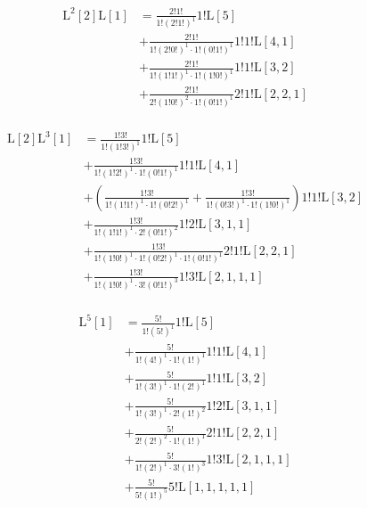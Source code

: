 \begin{equation*} \begin{aligned}
  \mathrm{L}^2[2] \mathrm{L}[1] &=
  \frac{2!1!}{1!(2!1!)^1}
  1! \mathrm{L}[5] \\ &
+ \frac{2!1!}{1!(2!0!)^1 \cdot 1!(0!1!)^1}
  1!1! \mathrm{L}[4, 1] \\ &
+ \frac{2!1!}{1!(1!1!)^1 \cdot 1!(1!0!)^1}
  1!1! \mathrm{L}[3, 2] \\ &
+ \frac{2!1!}{2!(1!0!)^2 \cdot 1!(0!1!)^1}
  2!1! \mathrm{L}[2, 2, 1] \\
\end{aligned} \end{equation*}

\begin{equation*} \begin{aligned}
  \mathrm{L}[2] \mathrm{L}^3[1] &=
  \frac{1!3!}{1!(1!3!)^1}
  1! \mathrm{L}[5] \\ &
+ \frac{1!3!}{1!(1!2!)^1 \cdot 1!(0!1!)^1}
  1!1! \mathrm{L}[4, 1] \\ &
+ \left(
  \frac{1!3!}{1!(1!1!)^1 \cdot 1!(0!2!)^1}
+ \frac{1!3!}{1!(0!3!)^1 \cdot 1!(1!0!)^1}
  \right)
  1!1! \mathrm{L}[3, 2] \\ &
+ \frac{1!3!}{1!(1!1!)^1 \cdot 2!(0!1!)^2}
  1!2! \mathrm{L}[3, 1, 1] \\ &
+ \frac{1!3!}{1!(1!0!)^1 \cdot 1!(0!2!)^1 \cdot 1!(0!1!)^1}
  2!1! \mathrm{L}[2, 2, 1] \\ &
+ \frac{1!3!}{1!(1!0!)^1 \cdot 3!(0!1!)^3}
  1!3! \mathrm{L}[2, 1, 1, 1] \\
\end{aligned} \end{equation*}

\begin{equation*} \begin{aligned}
  \mathrm{L}^5[1] &=
  \frac{5!}{1!(5!)^1}
  1! \mathrm{L}[5] \\ &
+ \frac{5!}{1!(4!)^1 \cdot 1!(1!)^1}
  1!1! \mathrm{L}[4, 1] \\ &
+ \frac{5!}{1!(3!)^1 \cdot 1!(2!)^1}
  1!1! \mathrm{L}[3, 2] \\ &
+ \frac{5!}{1!(3!)^1 \cdot 2!(1!)^2}
  1!2! \mathrm{L}[3, 1, 1] \\ &
+ \frac{5!}{2!(2!)^2 \cdot 1!(1!)^1}
  2!1! \mathrm{L}[2, 2, 1] \\ &
+ \frac{5!}{1!(2!)^1 \cdot 3!(1!)^3}
  1!3! \mathrm{L}[2, 1, 1, 1] \\ &
+ \frac{5!}{5!(1!)^5}
  5! \mathrm{L}[1, 1, 1, 1, 1] \\
\end{aligned} \end{equation*}

